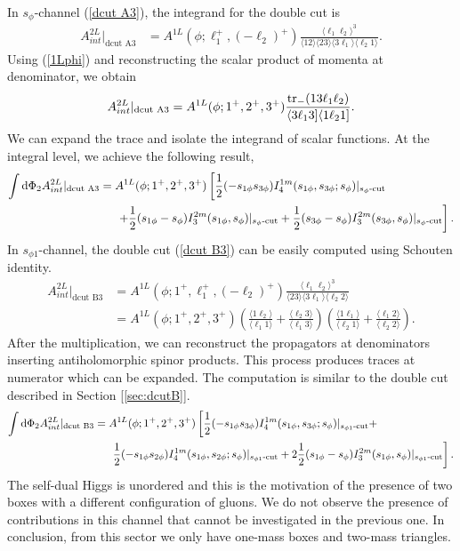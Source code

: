 In $s_\phi$-channel (\ref{dcut A3}), the integrand for the double cut is
\begin{align*}
	A^{2L}_{int}|_{\text{dcut A3}}&=A^{1L}(\phi;\ell_1^+,(-\ell_2)^+)\frac{\langle \ell_1 \ell_2 \rangle^3}{\langle 12 \rangle \langle 23 \rangle \langle 3 \ell_1 \rangle \langle \ell_2 1 \rangle}.
\end{align*}
Using (\ref{1Lphi}) and reconstructing the scalar product of momenta at denominator, we obtain
\begin{align*}
	A^{2L}_{int}|_{\text{dcut A3}}=A^{1L}(\phi;1^+,2^+,3^+)\frac{\tr_-(13\ell_1 \ell_2)}{\langle 3 \ell_1 3]\langle 1 \ell_2 1]}.
\end{align*}
We can expand the trace and isolate the integrand of scalar functions. At the integral level, we achieve the following result,
\begin{align*}
	\int \dd \Phi_2 A^{2L}_{int}|_{\text{dcut A3}}&=A^{1L}(\phi;1^+,2^+,3^+) \left[\frac{1}{2}(-s_{1\phi} s_{3\phi}) I_4^{1m}(s_{1\phi},s_{3\phi};s_\phi)|_{s_\phi\text{-cut}}\right.\\
	&\hspace{0.5cm}\left.+ \frac{1}{2}(s_{1\phi}-s_\phi)I_3^{2m}(s_{1\phi},s_\phi)|_{s_\phi\text{-cut}}+ \frac{1}{2}(s_{3\phi}-s_{\phi})I_3^{2m}(s_{3\phi},s_\phi)|_{s_\phi\text{-cut}}\right].
\end{align*}
In $s_{\phi1}$-channel, the double cut (\ref{dcut B3}) can be easily computed using Schouten identity.
\begin{align*}
	A^{2L}_{int}|_{\text{dcut B3}}&=A^{1L}(\phi;1^+,\ell_1^+,(-\ell_2)^+)\frac{\langle \ell_1 \ell_2 \rangle^3}{\langle 23 \rangle \langle 3 \ell_1 \rangle \langle \ell_2 2 \rangle}\\
	&=A^{1L}(\phi;1^+,2^+,3^+)\left(\frac{\langle 1 \ell_2 \rangle}{\langle \ell_1 1 \rangle}+\frac{\langle \ell_2 3 \rangle}{\langle \ell_1 3 \rangle}\right)\left(\frac{\langle 1 \ell_1 \rangle}{\langle \ell_2 1 \rangle}+\frac{\langle \ell_1 2 \rangle}{\langle \ell_2 2 \rangle}\right).
\end{align*}
After the multiplication, we can reconstruct the propagators at denominators inserting antiholomorphic spinor products. This process produces traces at numerator which can be expanded. The computation is similar to the double cut described in Section [\ref{sec:dcutB}].
\begin{align*}
	\int \dd \Phi_2 A^{2L}_{int}|_{\text{dcut B3}}&=A^{1L}(\phi;1^+,2^+,3^+)\left[\frac{1}{2}(-s_{1\phi}s_{3\phi})I_4^{1m}(s_{1\phi},s_{3\phi};s_\phi)|_{s_{\phi1}\text{-cut}}+\right.\\
	&\hspace{0.5cm}\left.\frac{1}{2}(-s_{1\phi}s_{2\phi})I_4^{1m}(s_{1\phi},s_{2\phi};s_\phi)|_{s_{\phi1}\text{-cut}} +2\frac{1}{2}(s_{1\phi}-s_\phi) I_3^{2m}(s_{1\phi},s_\phi)|_{s_{\phi1}\text{-cut}}\right].
\end{align*}
The self-dual Higgs is unordered and this is the motivation of the presence of two boxes with a different configuration of gluons.
We do not observe the presence of contributions in this channel that cannot be investigated in the previous one. In conclusion, from this sector we only have one-mass boxes and two-mass triangles.
